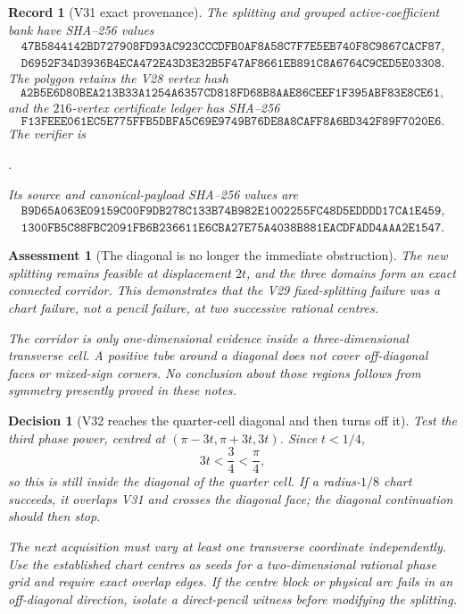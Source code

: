 \documentclass[11pt,oneside]{article}
\newtheorem{assessment}[theorem]{Assessment}
\newtheorem{record}[theorem]{Record}
\newtheorem{decision}[theorem]{Decision}
\theoremstyle{definition}
\theoremstyle{remark}
\begin{document}
\begin{record}[V31 exact provenance]
\label{rec:newv31-provenance}
The splitting and grouped active-coefficient bank have SHA--256
values
\[
\begin{gathered}
\texttt{47B5844142BD727908FD93AC923CCCDFB0AF8A58C7F7E5EB740F8C9867CACF87},\\
\texttt{D6952F34D3936B4ECA472E43D3E32B5F47AF8661EB891C8A6764C9CED5E03308}.
\end{gathered}                                          \tag{31.13}
\]
The polygon retains the V28 vertex hash
\[
\texttt{A2B5E6D80BEA213B33A1254A6357CD818FD68B8AAE86CEEF1F395ABF83E8CE61},
                                                               \tag{31.14}
\]
and the \(216\)-vertex certificate ledger has SHA--256
\[
\texttt{F13FEEE061EC5E775FFB5DBFA5C69E9749B76DE8A8CAFF8A6BD342F89F7020E6}.
                                                               \tag{31.15}
\]
The verifier is
\begin{center}
\footnotesize
{}.
\end{center}
Its source and canonical-payload SHA--256 values are
\[
\begin{gathered}
\texttt{B9D65A063E09159C00F9DB278C133B74B982E1002255FC48D5EDDDD17CA1E459},\\
\texttt{1300FB5C88FBC2091FB6B236611E6CBA27E75A4038B881EACDFADD4AAA2E1547}.
\end{gathered}                                          \tag{31.16}
\]
\end{record}

\begin{assessment}[The diagonal is no longer the immediate obstruction]
\label{ass:newv31}
The new splitting remains feasible at displacement \(2t\), and the
three domains form an exact connected corridor.  This demonstrates
that the V29 fixed-splitting failure was a chart failure, not a
pencil failure, at two successive rational centres.

The corridor is only one-dimensional evidence inside a
three-dimensional transverse cell.  A positive tube around a
diagonal does not cover off-diagonal faces or mixed-sign corners.
No conclusion about those regions follows from symmetry presently
proved in these notes.
\end{assessment}

\begin{decision}[V32 reaches the quarter-cell diagonal and then turns off it]
\label{dec:newv31-next}
Test the third phase power, centred at
\((\pi-3t,\pi+3t,3t)\).  Since \(t<1/4\),
\[
 3t<\frac34<\frac{\pi}{4},
\]
so this is still inside the diagonal of the quarter cell.  If a
radius-\(1/8\) chart succeeds, it overlaps V31 and crosses the
diagonal face; the diagonal continuation should then stop.

The next acquisition must vary at least one transverse coordinate
independently.  Use the established chart centres as seeds for a
two-dimensional rational phase grid and require exact overlap edges.
If the centre block or physical arc fails in an off-diagonal
direction, isolate a direct-pencil witness before modifying the
splitting.
\end{decision}
\end{document}
